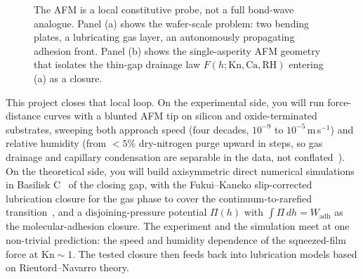 \documentclass[11pt]{article}
\begin{document}
\begin{figure}[H]
    \begin{center}
        \caption{The AFM is a local constitutive probe, not a full bond-wave analogue. Panel (a) shows the wafer-scale problem: two bending plates, a lubricating gas layer, an autonomously propagating adhesion front. Panel (b) shows the single-asperity AFM geometry that isolates the thin-gap drainage law $F(h; \mathrm{Kn}, \mathrm{Ca}, \mathrm{RH})$ entering (a) as a closure.}
        \label{fig:bridge}
    \end{center}
\end{figure}

This project closes that local loop. On the experimental side, you will run force-distance curves with a blunted AFM tip on silicon and oxide-terminated substrates, sweeping both approach speed (four decades, $10^{-9}$ to $10^{-5}$\,m\,s$^{-1}$) and relative humidity (from $<5\%$ dry-nitrogen purge upward in steps, so gas drainage and capillary condensation are separable in the data, not conflated~\citep{butt2005force}). On the theoretical side, you will build axisymmetric direct numerical simulations in Basilisk C~\citep{popinet2015quadtree,basiliskVatsal} of the closing gap, with the Fukui--Kaneko slip-corrected lubrication closure for the gas phase to cover the continuum-to-rarefied transition~\citep{fukui1988analysis, fukui1990database}, and a disjoining-pressure potential $\Pi(h)$ with $\int \Pi\,dh = W_{\mathrm{adh}}$ as the molecular-adhesion closure. The experiment and the simulation meet at one non-trivial prediction: the speed and humidity dependence of the squeezed-film force at $\mathrm{Kn} \sim 1$. The tested closure then feeds back into lubrication models based on Rieutord--Navarro theory.
\end{document}
